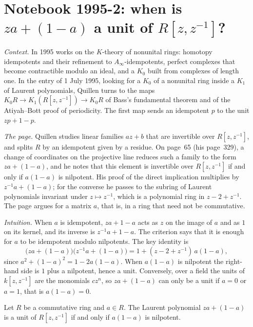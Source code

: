 \section[{Notebook 1995-2: when $za + 1 - a$ is a unit of $R[z, z^{-1}]$}]{Notebook 1995-2: when is $za + (1 - a)$ a unit of $R[z, z^{-1}]$?\protect{}}\label{sec:quillen-1995-2}

\emph{Context.} In 1995  works on the $K$-theory of nonunital rings: homotopy idempotents and their refinement to $A_\infty$-idempotents, perfect complexes that become contractible modulo an ideal, and a $K_0$ built from complexes of length one. In the entry of 1 July 1995, looking for a  $K_0$ of a nonunital ring inside a $K_1$ of Laurent polynomials, Quillen turns to the maps $K_0 R \to K_1(R[z, z^{-1}]) \to K_0 R$ of Bass's fundamental theorem and of the Atiyah--Bott proof of periodicity. The first map sends an idempotent $p$ to the unit $zp + 1 - p$.

\emph{The page.} Quillen studies linear families $az + b$ that are invertible over $R[z, z^{-1}]$, and splits $R$ by an idempotent given by a residue. On page~65 (his page~329), a change of coordinates on the projective line reduces such a family to the form $za + (1 - a)$, and he notes that this element is invertible over $R[z, z^{-1}]$ if and only if $a(1 - a)$ is nilpotent. His proof of the direct implication multiplies by $z^{-1}a + (1 - a)$; for the converse he passes to the subring of Laurent polynomials invariant under $z \mapsto z^{-1}$, which is a polynomial ring in $z - 2 + z^{-1}$. The page argues for a matrix $a$, that is, in a ring that need not be commutative.

\emph{Intuition.} When $a$ is idempotent, $za + 1 - a$ acts as $z$ on the image of $a$ and as $1$ on its kernel, and its inverse is $z^{-1}a + 1 - a$. The criterion says that it is enough for $a$ to be idempotent modulo nilpotents. The key identity is
\[
  \bigl(za + (1 - a)\bigr)\bigl(z^{-1}a + (1 - a)\bigr) = 1 + (z - 2 + z^{-1})\,a(1 - a),
\]
since $a^2 + (1 - a)^2 = 1 - 2a(1 - a)$. When $a(1 - a)$ is nilpotent the right-hand side is $1$ plus a nilpotent, hence a unit. Conversely, over a field the units of $k[z, z^{-1}]$ are the monomials $cz^n$, so $za + (1 - a)$ can only be a unit if $a = 0$ or $a = 1$, that is $a(1 - a) = 0$.

\begin{encadre}
\begin{theoreme}\label{thm:quillen-1995-2}
Let $R$ be a commutative ring and $a \in R$. The Laurent polynomial $za + (1 - a)$ is a unit of $R[z, z^{-1}]$ if and only if $a(1 - a)$ is nilpotent.
\end{theoreme}
\end{encadre}

